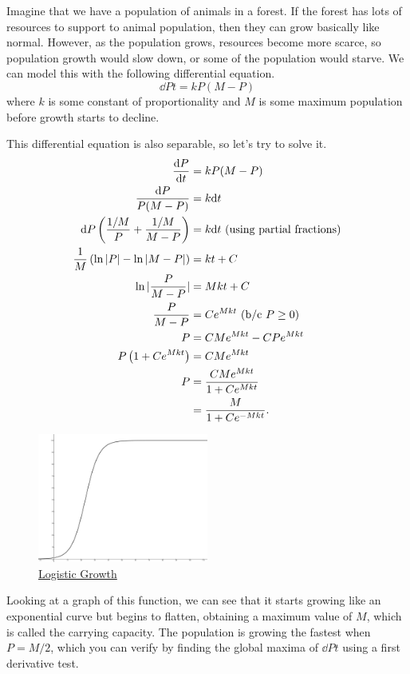 \begin{example}
	Imagine that we have a population of animals in a forest.
	If the forest has lots of resources to support to animal population, then they can grow basically like normal.
	However, as the population grows, resources become more scarce, so population growth would slow down, or some of the population would starve.
	We can model this with the following differential equation.
	\begin{equation*}
		\dd{P}{t} = kP(M-P)
	\end{equation*}
	where $k$ is some constant of proportionality and $M$ is some maximum population before growth starts to decline.
\end{example}
This differential equation is also separable, so let's try to solve it.
\begin{align*}
	\frac{\mathrm{d} P}{\mathrm{d} t} &= kP(M-P) \\
	\frac{\mathrm{d} P}{P(M-P)} &= k\mathrm{d} t \\
	\mathrm{d} P\left(\frac{1/M}{P}+\frac{1/M}{M-P}\right) &= k\mathrm{d} t \text{ (using partial fractions)} \\
	\frac{1}{M}\left(\ln{\lvert P \rvert} - \ln{\lvert M-P \rvert}\right) &= kt + C \\
	\ln{\lvert \frac{P}{M-P} \rvert} &= Mkt + C \\
	\frac{P}{M-P} &= Ce^{Mkt} \text{ (b/c $P \geq 0$)} \\
	P &= CMe^{Mkt} - CPe^{Mkt} \\
	P\left(1+Ce^{Mkt}\right) &= CMe^{Mkt} \\
	P &= \frac{CMe^{Mkt}}{1+Ce^{Mkt}} \\
	&= \frac{M}{1+Ce^{-Mkt}}.
\end{align*}

\begin{figure}[H]
	\label{logistic}
	\centering
	\includegraphics[width=0.5\textwidth]{./applications_integrals/logistic_growth.png}
	\caption{\hyperref{}{}{}{Logistic Growth}}
\end{figure}
\noindent
Looking at a graph of this function, we can see that it starts growing like an exponential curve but begins to flatten, obtaining a maximum value of $M$, which is called the carrying capacity.
The population is growing the fastest when $P=M/2$, which you can verify by finding the global maxima of $\dd{P}{t}$ using a first derivative test.

